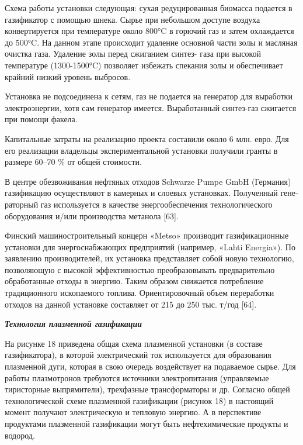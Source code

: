 \begin{multicols}{2}
Схема работы установки следующая: сухая редуцированная биомасса подается
в газификатор с помощью шнека. Сырье при небольшом доступе воздуха
конвертируется при температуре около 800°C в горючий газ и затем
охлаждается до 500°C. На данном этапе происходит удаление основной части
золы и масляная очистка газа. Удаление золы перед сжиганием синтез- газа
при высокой температуре (1300-1500°C) позволяет избежать спекания золы и
обеспечивает крайний низкий уровень выбросов.

Установка не подсоединена к сетям, газ не подается на генератор для
выработки электроэнергии, хотя сам генератор имеется. Выработанный
синтез-газ сжигается при помощи факела.

Капитальные затраты на реализацию проекта составили около 6 млн. евро.
Для его реализации владельцы экспериментальной установки получили гранты
в размере 60--70 \% от общей стоимости.

В центре обезвоживания нефтяных отходов Schwarze Pumpe GmbH (Германия)
газификацию осуществляют в камерных и слоевых установках. Полученный
гене­раторный газ используется в качестве энергообеспече­ния
технологического оборудования и/или производства метанола {[}63{]}.

Финский машиностроительный концерн «Metso» про­изводит газификационные
установки для энергоснаб­жающих предприятий (например, «Lahti Energia»).
По заявлению производителей, их установка представля­ет собой новую
технологию, позволяющую с высокой эффективностью преобразовывать
предварительно обработанные отходы в энергию. Таким образом снижает­ся
потребление традиционного ископаемого топлива. Ориентировочный объем
переработки отходов на данной установке составляет от 215 до 250 тыс.
т/год {[}64{]}.

\emph{{\bfseries Технология плазменной газификации}}

На рисунке 18 приведена общая схема плазменной установки (в составе
газификатора), в которой электрический ток используется для образования
плазменной дуги, которая в свою очередь воздействует на подаваемое
сырье. Для работы плазмотронов требуются источники электропитания
(управляемые тиристорные выпрямители), трехфазные трансформаторы и др.
Согласно общей технологической схеме плазменной газификации (рисунок 18)
в настоящий момент получают электрическую и тепловую энергию. А в
перспективе продуктами плазменной газификации могут быть нефтехимические
продукты и водород.
\end{multicols}

